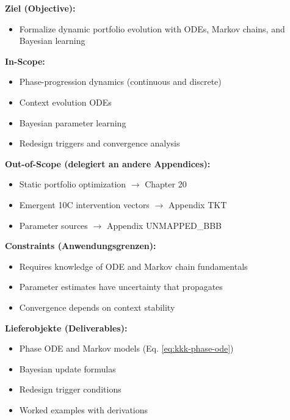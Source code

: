 \begin{tcolorbox}[
    colback=orange!5!white,
    colframe=orange!75!black,
    title={\textbf{Appendix Scope: Ziel / In-Scope / Out-of-Scope / Constraints}},
    fonttitle=\bfseries
]

\textbf{Ziel (Objective):}
\begin{itemize}[nosep]
    \item Formalize dynamic portfolio evolution with ODEs, Markov chains, and Bayesian learning
\end{itemize}

\textbf{In-Scope:}
\begin{itemize}[nosep]
    \item Phase-progression dynamics (continuous and discrete)
    \item Context evolution ODEs
    \item Bayesian parameter learning
    \item Redesign triggers and convergence analysis
\end{itemize}

\textbf{Out-of-Scope (delegiert an andere Appendices):}
\begin{itemize}[nosep]
    \item Static portfolio optimization $\rightarrow$ Chapter 20
    \item Emergent 10C intervention vectors $\rightarrow$ Appendix TKT
    \item Parameter sources $\rightarrow$ Appendix UNMAPPED_BBB
\end{itemize}

\textbf{Constraints (Anwendungsgrenzen):}
\begin{itemize}[nosep]
    \item Requires knowledge of ODE and Markov chain fundamentals
    \item Parameter estimates have uncertainty that propagates
    \item Convergence depends on context stability
\end{itemize}

\textbf{Lieferobjekte (Deliverables):}
\begin{itemize}[nosep]
    \item Phase ODE and Markov models (Eq. \ref{eq:kkk-phase-ode})
    \item Bayesian update formulas
    \item Redesign trigger conditions
    \item Worked examples with derivations
\end{itemize}

\end{tcolorbox}

